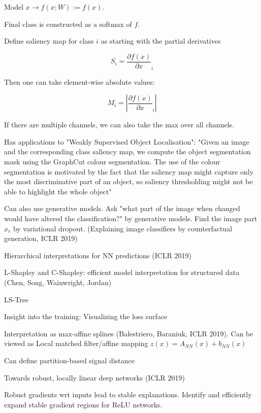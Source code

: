 \documentclass[english]{article}
\begin{document}
Model $x \to f(x;W):=f(x)$. 

Final class is constructed as a softmax of $f$.

Define saliency map for class $i$ as starting with the partial derivatives

$$S_i = \frac{\partial f(x)}{\partial x}_i$$

Then one can take element-wise absolute values: 

$$M_i = |\frac{\partial f(x)}{\partial x}_i|$$

If there are multiple channels, we can also take the max over all channels.

Has applications to "Weakly Supervised Object Localisation":  "Given an image and the corresponding class saliency map, we compute the object segmentation mask
using the GraphCut colour segmentation. The use of the colour segmentation is motivated by the
fact that the saliency map might capture only the most discriminative part of an object, so saliency
thresholding might not be able to highlight the whole object"

\item Can also use generative models. Ask "what part of the image when changed would have altered the classification?" by generative models. Find the image part $x_r$ by variational dropout. (Explaining image classifiers by counterfactual generation, ICLR 2019) 


\item Hierarchical interpretations for NN predictions (ICLR 2019)

\item L-Shapley and C-Shapley: efficient model interpretation for structured data (Chen, Song, Wainwright, Jordan)

LS-Tree


\item  Insight into the training: Visualizing the loss surface

\item Interpretation as max-affine splines (Balestriero, Baraniuk, ICLR 2019). Can be viewed as Local matched filter/affine mapping $z(x) = A_{NN}(x)+b_{NN}(x)$

Can define partition-based signal distance

\item Towards robust, locally linear deep networks (ICLR 2019)

Robust gradients wrt inputs lead to stable explanations. Identify and efficiently expand stable gradient regions for ReLU networks. 
\end{document}
